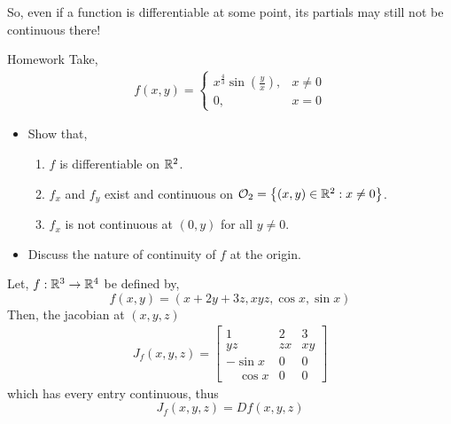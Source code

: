 \documentclass[../Analysis-3]{subfiles}
\begin{document}
So, even if a function is differentiable at some point, its partials may still not be continuous there!

\begin{Eg}{Homework}{}
  Take, \begin{align*}
    f(x,y) = \begin{cases}
               x^{\frac{4}{3}}\sin{\left( \frac{y}{x} \right)}, & x \not= 0 \\
               0,                                               & x = 0
             \end{cases}
  \end{align*}
  \begin{itemize}
    \item Show that, \begin{enumerate}
            \item $ f $ is differentiable on $ \mathbb{R}^2 $.
            \item $ f_x $ and $ f_y $ exist and continuous on $ \mathcal{O}_{2} = \left\{ (x,y)\in\mathbb{R}^2 : x \not= 0 \right\} $.
            \item $ f_x $ is not continuous at $ (0,y) $ for all $ y \not= 0 $.
          \end{enumerate}
    \item Discuss the nature of continuity of $ f $ at the origin.
  \end{itemize}
\end{Eg}

\begin{Eg}{}{}
  Let, $ f:\mathbb{R}^3 \to \mathbb{R}^4 $ be defined by, \[ f(x,y) = \left( x+2y+3z, xyz, \cos{x}, \sin{x} \right) \]
  Then, the jacobian at $ (x,y,z) $  \begin{align*}
    J_{f}(x,y,z) = \begin{bmatrix}
                     1             & 2  & 3  \\
                     yz            & zx & xy \\
                     -\sin{x}      & 0  & 0  \\
                     \quad \cos{x} & 0  & 0
                   \end{bmatrix}
  \end{align*}
  which has every entry continuous, thus \[J_{f}(x,y,z) = Df(x,y,z)\]
\end{Eg}
\end{document}
